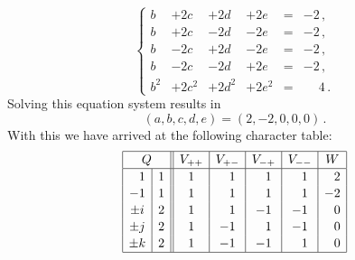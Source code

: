 \begin{example}
  \[
    \left\{
      \begin{array}{lllllcl}
        b   & + 2c    & + 2d    & + 2e    &=&           -2 \,, \\
        b   & + 2c    & - 2d    & - 2e    &=&           -2 \,, \\
        b   & - 2c    & + 2d    & - 2e    &=&           -2 \,, \\
        b   & - 2c    & - 2d    & + 2e    &=&           -2 \,, \\
        b^2 & + 2c^2  & + 2d^2  & + 2e^2  &=& \phantom{-}4 \,.
      \end{array}
    \right.
  \]
  Solving this equation system results in
  \[
      (a,b,c,d,e)
    = (2,-2,0,0,0) \,.
  \]
  With this we have arrived at the following character table:
  \[
    \begingroup
    \renewcommand{\arraystretch}{1.1}
    \begin{array}{|c|c||c|c|c|c|c|}
      \hline
        \multicolumn{2}{|c||}{Q}
      & V_{++}
      & V_{+-}
      & V_{-+}
      & V_{--}
      & W
      \\
      \hline
       \phantom{-}1
      & 1
      &            1
      & \phantom{-}1
      & \phantom{-}1
      & \phantom{-}1
      & \phantom{-}2
      \\
        -1
      & 1
      &            1
      & \phantom{-}1
      & \phantom{-}1
      & \phantom{-}1
      &           -2
      \\
        \pm i
      & 2
      &            1
      & \phantom{-}1
      &           -1
      &           -1
      & \phantom{-}0
      \\
        \pm j
      & 2
      &            1
      &           -1
      & \phantom{-}1
      &           -1
      & \phantom{-}0
      \\
        \pm k
      & 2
      &            1
      &           -1
      &           -1
      & \phantom{-}1
      & \phantom{-}0
      \\
      \hline
    \end{array}
    \endgroup
  \]
\end{example}








